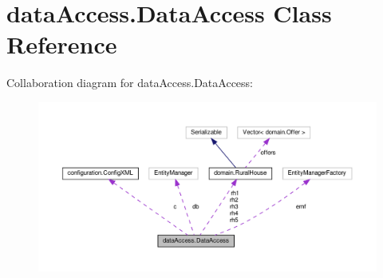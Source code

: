 \hypertarget{classdata_access_1_1_data_access}{}\section{data\+Access.\+Data\+Access Class Reference}
\label{classdata_access_1_1_data_access}


Collaboration diagram for data\+Access.\+Data\+Access\+:
\nopagebreak
\begin{figure}[H]
\begin{center}
\leavevmode
\includegraphics[width=350pt]{classdata_access_1_1_data_access__coll__graph}
\end{center}
\end{figure}
